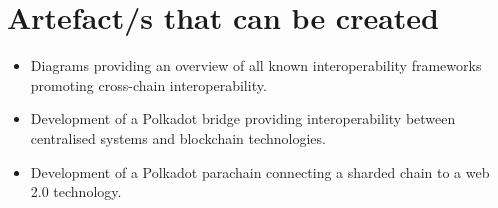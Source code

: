 \documentclass[12pt]{article}
\begin{document}
\section{Artefact/s that can be created}
\begin{itemize}
    \item Diagrams providing an overview of all known interoperability frameworks promoting cross-chain interoperability.
    \item Development of a Polkadot bridge providing interoperability between centralised systems and blockchain technologies.
    \item Development of a Polkadot parachain connecting a sharded chain to a web 2.0 technology.
\end{itemize}

\printbibliography
\end{document}
